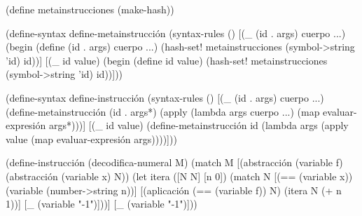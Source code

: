 \documentclass[letterpaper,twoside,openright,11pt]{book}
\begin{document}
\nwenddocs{}\endmoddef
(define metainstrucciones (make-hash))

\eatline
{}\nwendcode{}\nwdocspar


\nwenddocs{}\endmoddef
(define-syntax define-metainstrucción
  (syntax-rules ()
    [(_ (id . args) cuerpo ...)
     (begin
       (define (id . args) cuerpo ...)
       (hash-set! metainstrucciones (symbol->string 'id) id))]
    [(_ id value)
     (begin
       (define id value)
       (hash-set! metainstrucciones (symbol->string 'id) id))]))

(define-syntax define-instrucción
  (syntax-rules ()
    [(_ (id . args) cuerpo ...)
     (define-metainstrucción (id . args*)
       (apply (lambda args cuerpo ...)
              (map evaluar-expresión args*)))]
    [(_ id value)
     (define-metainstrucción id
       (lambda args
         (apply value (map evaluar-expresión args))))]))

\eatline
{}\nwendcode{}\nwdocspar


\nwenddocs{}\endmoddef
(define-instrucción (decodifica-numeral M)
  (match M
    [(abstracción (variable f) (abstracción (variable x) N))
     (let itera ([N N]
                 [n 0])
       (match N
         [(== (variable x))
          (variable (number->string n))]
         [(aplicación (== (variable f)) N)
          (itera N (+ n 1))]
         [_
          (variable "-1")]))]
    [_ (variable "-1")]))
\end{document}
